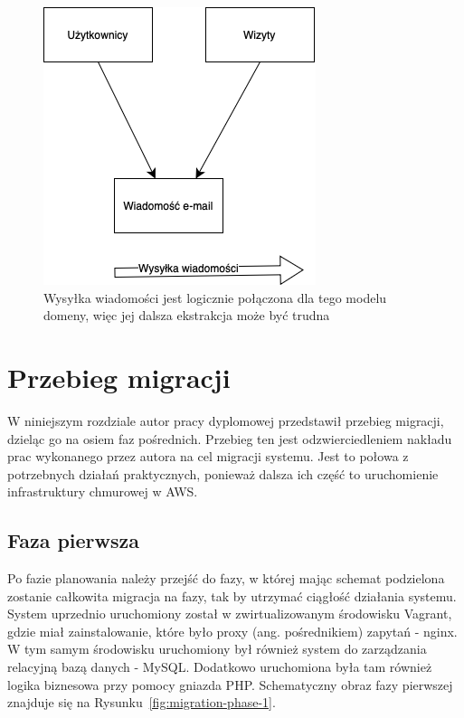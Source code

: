 \documentclass[12pt,twoside]{book}
\newcommand{\captionvspace}{\vspace{6pt}}
\begin{document}
\begin{figure}[ht]
\centering
\includegraphics[width=\textwidth]{includes/images/event-storming-approach.png}
\captionvspace
\caption{Wysyłka wiadomości jest logicznie połączona dla tego modelu domeny, więc jej dalsza ekstrakcja może być trudna}
\label{fig:event-storming-approach}
\end{figure}

\chapter{Przebieg migracji}
W niniejszym rozdziale autor pracy dyplomowej przedstawił przebieg migracji, dzieląc go na osiem faz pośrednich. Przebieg ten jest odzwierciedleniem nakładu prac wykonanego przez autora na cel migracji systemu. Jest to połowa z potrzebnych działań praktycznych, ponieważ dalsza ich część to uruchomienie infrastruktury chmurowej w AWS.

\section{Faza pierwsza}
Po fazie planowania należy przejść do fazy, w której mając schemat podzielona zostanie całkowita migracja na fazy, tak by utrzymać ciągłość działania systemu. System uprzednio uruchomiony został w zwirtualizowanym środowisku Vagrant, gdzie miał zainstalowanie, które było proxy (ang. pośrednikiem) zapytań - nginx. W tym samym środowisku uruchomiony był również system do zarządzania relacyjną bazą danych - MySQL. Dodatkowo uruchomiona była tam również logika biznesowa przy pomocy gniazda PHP. Schematyczny obraz fazy pierwszej znajduje się na Rysunku~\ref{fig:migration-phase-1}.
\end{document}
